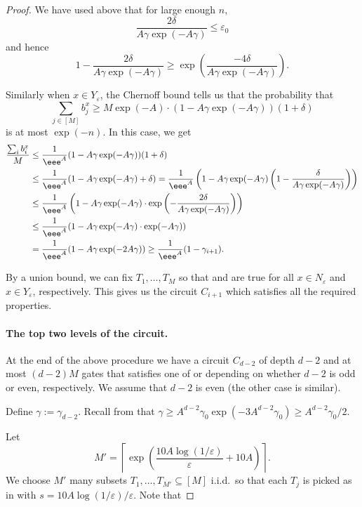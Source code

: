 \documentclass{toc}
\begin{document}
\begin{proof}
We have used above that for large enough $n$,
\[
  \frac{2\delta}{A\gamma\exp(-A\gamma)}\leq \varepsilon_0
\]
and hence
\[
  1-\frac{2\delta}{A\gamma\exp(-A\gamma)}\geq \exp\left(\frac{-4\delta}{A\gamma\exp(-A\gamma)}\right).
\]

Similarly when $x\in Y_\varepsilon$, the Chernoff bound tells us that the probability that
\[
  \sum_{j\in [M]}b_j^x\geq M\exp(-A)\cdot (1-A\gamma\exp(-A\gamma))(1+\delta)
\]
is at most $\exp(-n)$. In this case, we get
\begin{align}
\frac{\sum_i b_i^x}{M}&\leq \frac{1}{\eee^A}(1-A\gamma\exp(-A\gamma))(1+\delta)\notag\\
&\leq \frac{1}{\eee^A}(1-A\gamma\exp(-A\gamma) +\delta) = \frac{1}{\eee^A}\left(1-A\gamma\exp(-A\gamma)\left(1-\frac{\delta}{A\gamma\exp(-A\gamma)}\right)\right)\notag\\
&\leq \frac{1}{\eee^A}\left(1-A\gamma\exp(-A\gamma)\cdot\exp\left(-\frac{2\delta}{A\gamma\exp(-A\gamma)}\right)\right)\notag\\
&\leq \frac{1}{\eee^A}(1-A\gamma\exp(-A\gamma)\cdot \exp(-A\gamma))\notag\\
&= \frac{1}{\eee^A}(1-A\gamma\exp(-2A\gamma))\geq \frac{1}{\eee^A}(1-\gamma_{i+1}).\label{eq:Ci.3}
\end{align}

By a union bound, we can fix $T_1,\ldots,T_M$ so that  and  are true for all $x\in N_\varepsilon$ and $x\in Y_\varepsilon$, %
respectively. This gives us the circuit $C_{i+1}$ which satisfies all the required properties.

\paragraph{The top two levels of the circuit.} At the end of the above procedure we have a circuit $C_{d-2}$ of depth $d-2$ and at most $(d-2)M$ gates that satisfies one of  or  depending on whether $d-2$ is odd or even,  %
respectively. We assume that $d-2$ is even (the other case is similar). 

Define $\gamma := \gamma_{d-2}$. Recall from  that $\gamma \geq A^{d-2}\gamma_0\exp(-3A^{d-2}\gamma_0)\geq A^{d-2}\gamma_0/2$.

Let
\[
  M' = \left\lceil \exp\left(\frac{10A\log(1/\varepsilon)}{\varepsilon}+10A\right)\right\rceil.
\]
We choose $M'$ many subsets $T_1,\ldots,T_{M'}\subseteq [M]$ i.i.d.\
so that each $T_j$ is picked as in 
with $s = 10A\log(1/\varepsilon)/\varepsilon$. Note that


\end{proof}
\end{document}
